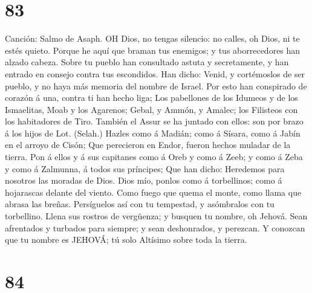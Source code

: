 \hypertarget{section-82}{%
\section{83}\label{section-82}}

 Canción: Salmo de Asaph. OH Dios, no tengas silencio: no
calles, oh Dios, ni te estés quieto.  Porque he aquí que
braman tus enemigos; y tus aborrecedores han alzado cabeza. 
Sobre tu pueblo han consultado astuta y secretamente, y han entrado en
consejo contra tus escondidos.  Han dicho: Venid, y
cortémoslos de ser pueblo, y no haya más memoria del nombre de Israel.
 Por esto han conspirado de corazón á una, contra ti han
hecho liga;  Los pabellones de los Idumeos y de los
Ismaelitas, Moab y los Agarenos;  Gebal, y Ammón, y Amalec;
los Filisteos con los habitadores de Tiro.  También el Assur
se ha juntado con ellos: son por brazo á los hijos de Lot. (Selah.)
 Hazles como á Madián; como á Sísara, como á Jabín en el
arroyo de Cisón;  Que perecieron en Endor, fueron hechos
muladar de la tierra.  Pon á ellos y á sus capitanes como á
Oreb y como á Zeeb; y como á Zeba y como á Zalmunna, á todos sus
príncipes;  Que han dicho: Heredemos para nosotros las
moradas de Dios.  Dios mío, ponlos como á torbellinos; como
á hojarascas delante del viento.  Como fuego que quema el
monte, como llama que abrasa las breñas.  Persíguelos así
con tu tempestad, y asómbralos con tu torbellino.  Llena
sus rostros de vergüenza; y busquen tu nombre, oh Jehová. 
Sean afrentados y turbados para siempre; y sean deshonrados, y perezcan.
 Y conozcan que tu nombre es JEHOVÁ; tú solo Altísimo sobre
toda la tierra.

\hypertarget{section-83}{%
\section{84}\label{section-83}}


